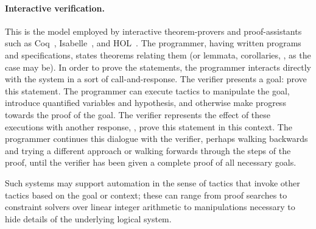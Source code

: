 \paragraph{Interactive verification.} This is the model employed by interactive
theorem-provers and proof-assistants such as Coq~\cite{Coq},
Isabelle~\cite{Isabelle}, and HOL~\cite{HOL}. The programmer, having written
programs and specifications, states theorems relating them (or lemmata,
corollaries, \etc, as the case may be). In order to prove the statements, the
programmer interacts directly with the system in a sort of call-and-response.
The verifier presents a goal: prove this statement. The programmer can execute
tactics to manipulate the goal, introduce quantified variables and hypothesis,
and otherwise make progress towards the proof of the goal. The verifier
represents the effect of these executions with another response, \eg, prove this
statement in this context. The programmer continues this dialogue with the
verifier, perhaps walking backwards and trying a different approach or walking
forwards through the steps of the proof, until the verifier has been given a
complete proof of all necessary goals.

Such systems may support automation in the sense of tactics that invoke other
tactics based on the goal or context; these can range from proof searches to
constraint solvers over linear integer arithmetic to manipulations necessary to
hide details of the underlying logical system.

